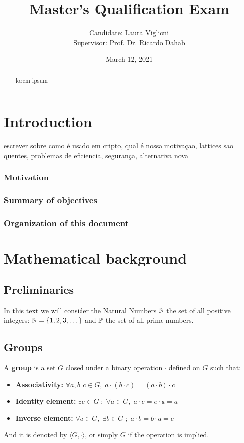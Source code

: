\documentclass[a4paper,12pt]{article}
\author{Candidate: Laura Viglioni \\ Supervisor: Prof. Dr. Ricardo Dahab}
\date{March 12, 2021}
\title{Master’s Qualification Exam}
\begin{document}
\maketitle
\begin{abstract}
lorem ipsum
\end{abstract}
\pagebreak


\section{Introduction}
\label{sec:org6f1c4a6}
escrever sobre como é usado em cripto, qual é nossa motivaçao, lattices sao quentes, problemas de eficiencia, segurança, alternativa nova
\subsubsection*{Motivation}
\label{sec:orgaba916c}
\subsubsection*{Summary of objectives}
\label{sec:orgcefd833}
\subsubsection*{Organization of this document}
\label{sec:orgc555a2f}
\section{Mathematical background}
\label{sec:orgc3ff093}
\subsection{Preliminaries}
\label{sec:orgc4ed3b9}
In this text we will consider the Natural Numbers \(\N\) the set of all positive integers: \(\N = \{1,2,3,\dots\}\) and \(\P\) the set of all prime numbers. 
\subsection{Groups}
\label{sec:orgb1ea44f}

\begin{definition}
  A \textbf{group} is a set $G$ closed under a binary operation $\cdot$ defined on $G$ such
  that:
  \begin{itemize}
  \item \textbf{Associativity: } $\forall a,b,c \in G, \; a\cdot(b\cdot c) = (a\cdot b)\cdot c$
  \item \textbf{Identity element: } $\exists e \in G \; ; \; \forall a \in G, \; a\cdot e = e\cdot a = a$
  \item \textbf{Inverse element: } $\forall a \in G, \; \exists b \in G \; ; \; a\cdot b = b \cdot a = e$
  \end{itemize}
And it is denoted by $\langle G,\cdot\rangle$, or simply $G$ if the operation is implied.
\end{definition}
\end{document}

